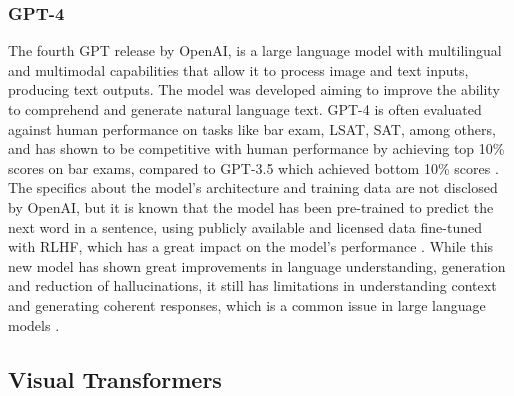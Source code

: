 \documentclass[english, 12pt, a4paper, elec, utf8, a-2b, online]{aaltothesis}
\begin{document}

\subsubsection{GPT-4}

The fourth \ac{GPT} release by OpenAI, is a large language model with multilingual and multimodal capabilities that allow it to process image and text inputs, producing text outputs.
The model was developed aiming to improve the ability to comprehend and generate natural language text.
\ac{GPT}-4 is often evaluated against human performance on tasks like bar exam, LSAT, SAT, among others, and has shown to be competitive with human performance by achieving top 10\% scores on bar exams, compared to \ac{GPT}-3.5 which achieved bottom 10\% scores \cite{OpenAI2023GPT4}.
The specifics about the model's architecture and training data are not disclosed by OpenAI, but it is known that the model has been pre-trained to predict the next word in a sentence, using publicly available and licensed data fine-tuned with \ac{RLHF}, which has a great impact on the model's performance \cite{OpenAI2023GPT4}.
While this new model has shown great improvements in language understanding, generation and reduction of hallucinations, it still has limitations in understanding context and generating coherent responses, which is a common issue in large language models \cite{OpenAI2023GPT4}.

\subsection{Visual Transformers}
\end{document}

